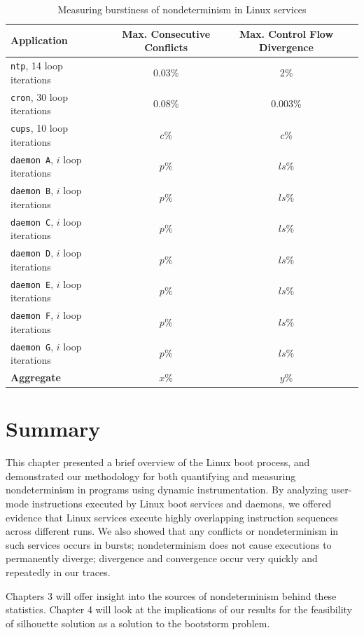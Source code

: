 \begin{table}
\caption{Measuring burstiness of nondeterminism in Linux services} 
\label{burst:stats}
\begin{center}
\begin{tabular}{||l|c|c|c||}\hline
  Application & Max. Consecutive Conflicts & Max. Control Flow Divergence \\
  \hline \hline
  \texttt{ntp}, 14 loop iterations & 0.03\% & 2\% 
  \\\hline
  \texttt{cron}, 30 loop iterations & 0.08\% & 0.003\% 
  \\\hline 
  \texttt{cups}, 10 loop iterations & $c$\% & $c$\% 
  \\\hline 
  \texttt{daemon A}, $i$ loop iterations & $p$\% & $ls$\% 
  \\\hline 
  \texttt{daemon B}, $i$ loop iterations & $p$\% & $ls$\% 
  \\\hline 
  \texttt{daemon C}, $i$ loop iterations & $p$\% & $ls$\% 
  \\\hline 
  \texttt{daemon D}, $i$ loop iterations & $p$\% & $ls$\% 
  \\\hline 
  \texttt{daemon E}, $i$ loop iterations & $p$\% & $ls$\% 
  \\\hline 
  \texttt{daemon F}, $i$ loop iterations & $p$\% & $ls$\% 
  \\\hline 
  \texttt{daemon G}, $i$ loop iterations & $p$\% & $ls$\% 
  \\\hline 
  \hline 
  {\bf Aggregate} & {\bf $x$}\% & {\bf $y$}\% %
  \\\hline 
\end{tabular}
\end{center}
\end{table}


\newpage \section{Summary}
This chapter presented a brief overview of the Linux boot process,
and demonstrated our methodology for both quantifying and measuring nondeterminism
in programs using dynamic instrumentation. By analyzing user-mode
instructions executed by Linux boot services and daemons, we offered
evidence that Linux services execute highly overlapping instruction
sequences across different runs. We also showed
that any conflicts or nondeterminism in such services occurs in bursts;
nondeterminism does not cause executions to permanently diverge;
divergence and convergence occur very quickly and repeatedly in our
traces.

Chapters 3 will offer insight into the sources 
of nondeterminism behind these statistics. 
Chapter 4 will look at the implications of our results 
for the feasibility of silhouette solution as a solution to the bootstorm problem.


